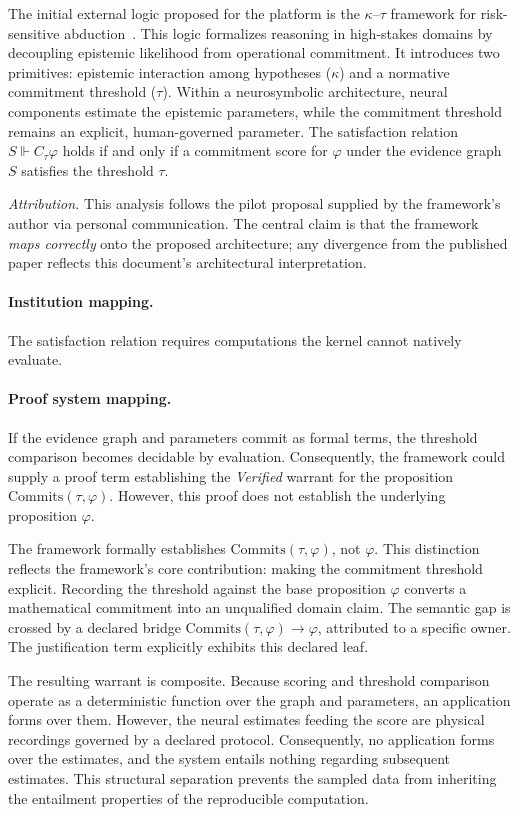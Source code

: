 \documentclass[manuscript,nonacm=true]{acmart}
\begin{document}
The initial external logic proposed for the platform is the $\kappa$--$\tau$ framework for risk-sensitive abduction~\cite{kt}. This logic formalizes reasoning in high-stakes domains by decoupling epistemic likelihood from operational commitment. It introduces two primitives: epistemic interaction among hypotheses ($\kappa$) and a normative commitment threshold ($\tau$). Within a neurosymbolic architecture, neural components estimate the epistemic parameters, while the commitment threshold remains an explicit, human-governed parameter. The satisfaction relation $S \Vdash C_\tau\varphi$ holds if and only if a commitment score for $\varphi$ under the evidence graph $S$ satisfies the threshold $\tau$.

\emph{Attribution.} This analysis follows the pilot proposal supplied by the framework's author via personal communication. The central claim is that the framework \emph{maps correctly} onto the proposed architecture; any divergence from the published paper reflects this document's architectural interpretation.

\paragraph{Institution mapping.} The satisfaction relation requires computations the kernel cannot natively evaluate.

\paragraph{Proof system mapping.} If the evidence graph and parameters commit as formal terms, the threshold comparison becomes decidable by evaluation. Consequently, the framework could supply a proof term establishing the \emph{Verified} warrant for the proposition $\mathrm{Commits}(\tau, \varphi)$. However, this proof does not establish the underlying proposition $\varphi$.

The framework formally establishes $\mathrm{Commits}(\tau,\varphi)$, not $\varphi$. This distinction reflects the framework's core contribution: making the commitment threshold explicit. Recording the threshold against the base proposition $\varphi$ converts a mathematical commitment into an unqualified domain claim. The semantic gap is crossed by a declared bridge $\mathrm{Commits}(\tau,\varphi) \rightarrow \varphi$, attributed to a specific owner. The justification term explicitly exhibits this declared leaf.

The resulting warrant is composite. Because scoring and threshold comparison operate as a deterministic function over the graph and parameters, an application forms over them. However, the neural estimates feeding the score are physical recordings governed by a declared protocol. Consequently, no application forms over the estimates, and the system entails nothing regarding subsequent estimates. This structural separation prevents the sampled data from inheriting the entailment properties of the reproducible computation.
\end{document}
